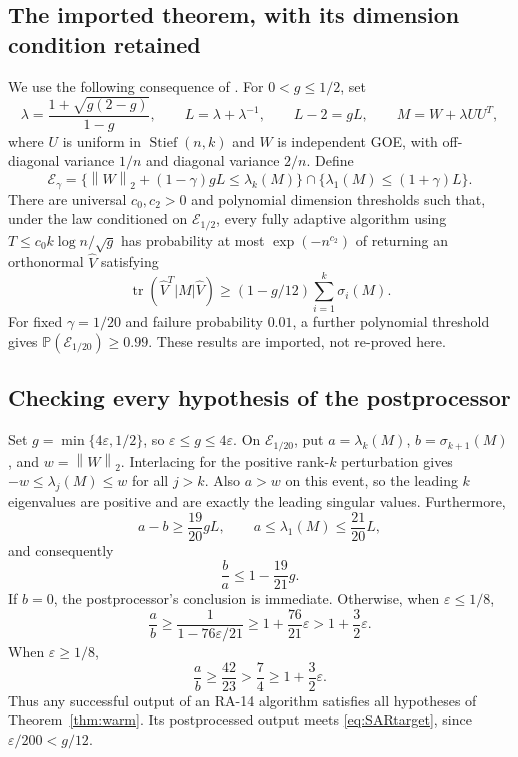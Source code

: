 \documentclass[11pt]{article}
\numberwithin{equation}{section}
\theoremstyle{definition}
\newcommand{\Prb}{\mathbb P}
\newcommand{\norm}[1]{\left\lVert#1\right\rVert}
\newcommand{\tr}{\operatorname{tr}}
\newcommand{\eps}{\varepsilon}
\newcommand{\St}{\operatorname{Stief}}
\newcommand{\cgood}{\mathcal E}
\begin{document}
\subsection{The imported theorem, with its dimension condition retained}
We use the following consequence of \cite[Theorem 1, Proposition 2.1,
and Theorem 2.2]{SAR18}. For $0<g\le1/2$, set
\begin{equation}
 \lambda=\frac{1+\sqrt{g(2-g)}}{1-g},\qquad
 L=\lambda+\lambda^{-1},\qquad L-2=gL,
 \qquad M=W+\lambda UU^T,
 \label{eq:SARmodel}
\end{equation}
where $U$ is uniform in $\St(n,k)$ and $W$ is independent GOE, with
off-diagonal variance $1/n$ and diagonal variance $2/n$. Define
\begin{equation}
 \cgood_\gamma=
 \{\norm W_2+(1-\gamma)gL\le\lambda_k(M)\}
 \cap\{\lambda_1(M)\le(1+\gamma)L\}.
 \label{eq:goodevent}
\end{equation}
There are universal $c_0,c_2>0$ and polynomial dimension thresholds such that,
under the law conditioned on $\cgood_{1/2}$, every fully adaptive algorithm
using $T\le c_0k\log n/\sqrt g$ has probability at most $\exp(-n^{c_2})$ of
returning an orthonormal $\widehat V$ satisfying
\begin{equation}
 \tr(\widehat V^T|M|\widehat V)
 \ge(1-g/12)\sum_{i=1}^k\sigma_i(M).
 \label{eq:SARtarget}
\end{equation}
For fixed $\gamma=1/20$ and failure probability $0.01$, a further polynomial
threshold gives $\Prb(\cgood_{1/20})\ge0.99$. These results are imported,
not re-proved here.

\subsection{Checking every hypothesis of the postprocessor}
Set $g=\min\{4\eps,1/2\}$, so $\eps\le g\le4\eps$. On
$\cgood_{1/20}$, put $a=\lambda_k(M)$, $b=\sigma_{k+1}(M)$, and
$w=\norm W_2$. Interlacing for the positive rank-$k$ perturbation gives
$-w\le\lambda_j(M)\le w$ for all $j>k$. Also $a>w$ on this event, so the
leading $k$ eigenvalues are positive and are exactly the leading singular
values. Furthermore,
\[
 a-b\ge\frac{19}{20}gL,\qquad
 a\le\lambda_1(M)\le\frac{21}{20}L,
\]
and consequently
\begin{equation}
 \frac ba\le1-\frac{19}{21}g.
 \label{eq:SARgap}
\end{equation}
If $b=0$, the postprocessor's conclusion is immediate. Otherwise, when
$\eps\le1/8$,
\[
 \frac ab\ge\frac1{1-76\eps/21}
 \ge1+\frac{76}{21}\eps>1+\frac32\eps.
\]
When $\eps\ge1/8$,
\[
 \frac ab\ge\frac{42}{23}>\frac74\ge1+\frac32\eps.
\]
Thus any successful output of an RA-14 algorithm satisfies all hypotheses of
Theorem~\ref{thm:warm}. Its postprocessed output meets
\eqref{eq:SARtarget}, since $\eps/200<g/12$.
\end{document}
